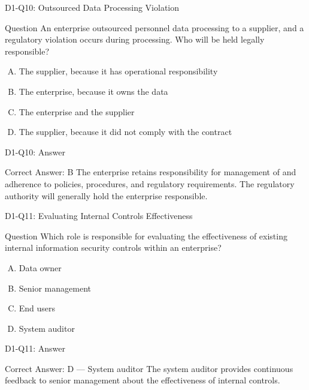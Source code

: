 \documentclass{beamer}
\begin{document}
	\begin{frame}{D1-Q10: Outsourced Data Processing Violation}
		\begin{block}{Question}
			An enterprise outsourced personnel data processing to a supplier, and a regulatory violation occurs during processing. Who will be held legally responsible?
		\end{block}
		\begin{enumerate}[(A)]
			\item The supplier, because it has operational responsibility
			\item The enterprise, because it owns the data
			\item The enterprise and the supplier
			\item The supplier, because it did not comply with the contract
		\end{enumerate}
	\end{frame}
	\begin{frame}{D1-Q10: Answer}
		\begin{block}{Correct Answer: B}
			The enterprise retains responsibility for management of and adherence to policies, procedures, and regulatory requirements. The regulatory authority will generally hold the enterprise responsible.
		\end{block}
	\end{frame}
	
	\begin{frame}{D1-Q11: Evaluating Internal Controls Effectiveness}
		\begin{block}{Question}
			Which role is responsible for evaluating the effectiveness of existing internal information security controls within an enterprise?
		\end{block}
		\begin{enumerate}[(A)]
			\item Data owner
			\item Senior management
			\item End users
			\item System auditor
		\end{enumerate}
	\end{frame}
	\begin{frame}{D1-Q11: Answer}
		\begin{block}{Correct Answer: D --- System auditor}
			The system auditor provides continuous feedback to senior management about the effectiveness of internal controls.
		\end{block}
	\end{frame}
	
\end{document}
